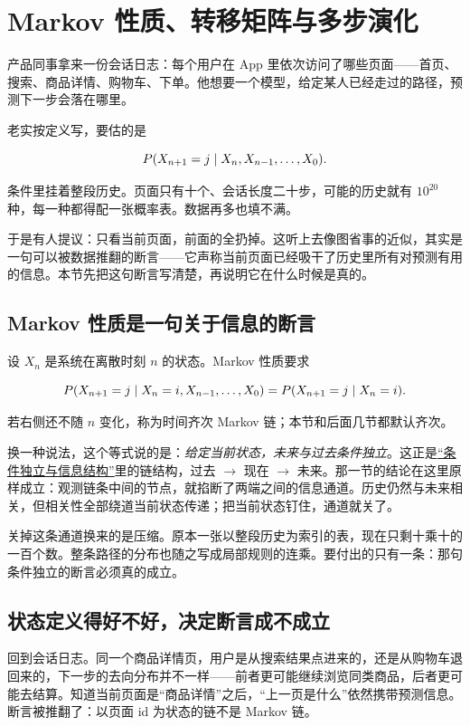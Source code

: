 \section{Markov 性质、转移矩阵与多步演化}
\label{sec:06-Random-Processes/03-Markov-Chains/01}

产品同事拿来一份会话日志：每个用户在 App 里依次访问了哪些页面——首页、搜索、商品详情、购物车、下单。他想要一个模型，给定某人已经走过的路径，预测下一步会落在哪里。

老实按定义写，要估的是

\[
P(X_{n+1}=j\mid X_n,X_{n-1},\ldots,X_0).
\]

条件里挂着整段历史。页面只有十个、会话长度二十步，可能的历史就有 \(10^{20}\) 种，每一种都得配一张概率表。数据再多也填不满。

于是有人提议：只看当前页面，前面的全扔掉。这听上去像图省事的近似，其实是一句可以被数据推翻的断言——它声称当前页面已经吸干了历史里所有对预测有用的信息。本节先把这句断言写清楚，再说明它在什么时候是真的。

\subsection{Markov 性质是一句关于信息的断言}

设 \(X_n\) 是系统在离散时刻 \(n\) 的状态。Markov 性质要求

\[
P(X_{n+1}=j\mid X_n=i,X_{n-1},\ldots,X_0)
=P(X_{n+1}=j\mid X_n=i).
\]

若右侧还不随 \(n\) 变化，称为时间齐次 Markov 链；本节和后面几节都默认齐次。

换一种说法，这个等式说的是：\emph{给定当前状态，未来与过去条件独立}。这正是\hyperref[sec:05-Probability/02-Conditional-Probability/04]{``条件独立与信息结构''}里的链结构，过去 \(\to\) 现在 \(\to\) 未来。那一节的结论在这里原样成立：观测链条中间的节点，就掐断了两端之间的信息通道。历史仍然与未来相关，但相关性全部绕道当前状态传递；把当前状态钉住，通道就关了。

关掉这条通道换来的是压缩。原本一张以整段历史为索引的表，现在只剩十乘十的一百个数。整条路径的分布也随之写成局部规则的连乘。要付出的只有一条：那句条件独立的断言必须真的成立。

\subsection{状态定义得好不好，决定断言成不成立}

回到会话日志。同一个商品详情页，用户是从搜索结果点进来的，还是从购物车退回来的，下一步的去向分布并不一样——前者更可能继续浏览同类商品，后者更可能去结算。知道当前页面是``商品详情''之后，``上一页是什么''依然携带预测信息。断言被推翻了：以页面 id 为状态的链不是 Markov 链。

